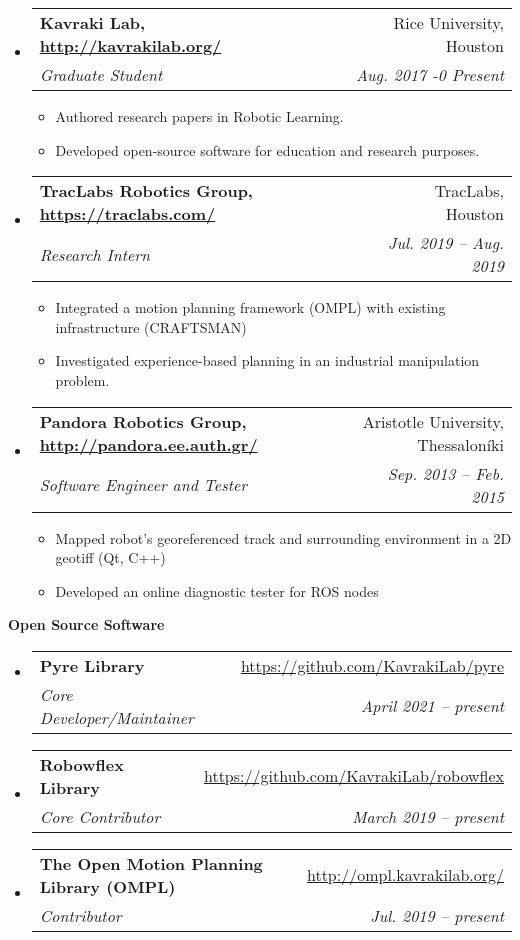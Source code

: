 \documentclass[letterpaper,11pt]{article}
\makeatletter
\newcommand{\resitem}[1]{\item #1 \vspace{-2pt}}
\newcommand{\resheading}[1]{{\large \colorbox{mygrey}{\begin{minipage}{\textwidth}{\textbf{#1 \vphantom{p\^{E}}}}\end{minipage}}}}
\newcommand{\ressubheading}[4]{
\begin{tabular*}{7.0in}{l@{\extracolsep{\fill}}r}
		\textbf{#1} & #2 \\
		\textit{#3} & \textit{#4} \\
\end{tabular*}\vspace{-6pt}}
\makeatother
\begin{document}
\begin{itemize}
	
    \item
        \ressubheading{Kavraki Lab, \url{http://kavrakilab.org/}}
	{Rice University, Houston}{Graduate Student}
	{Aug. 2017 -0 Present  }
	\begin{itemize}
		\resitem{Authored research papers in Robotic Learning.}
		\resitem{Developed open-source software for education and research purposes.}
	\end{itemize}
    \item
    \ressubheading{TracLabs Robotics Group, \url{https://traclabs.com/}}
    {TracLabs, Houston}{Research Intern}
    {Jul. 2019 -- Aug. 2019}
    \begin{itemize}
    	\resitem{Integrated a motion planning framework (OMPL) with existing infrastructure (CRAFTSMAN)}
    \resitem{Investigated experience-based planning in an industrial manipulation problem.}
    \end{itemize}
	\item
     \ressubheading{Pandora Robotics Group, \url{http://pandora.ee.auth.gr/}}
	{Aristotle University, Thessaloníki}{Software Engineer and Tester}
	{Sep. 2013 -- Feb. 2015}
	\begin{itemize}
		\resitem{Mapped robot’s georeferenced track and surrounding environment in a 2D geotiff (Qt, C++)}
		\resitem{Developed an online diagnostic tester for ROS nodes}
	\end{itemize}
\end{itemize}


\resheading{Open Source Software}
\begin{itemize}
    \item \ressubheading{Pyre Library}
        {\url{https://github.com/KavrakiLab/pyre}}{Core Developer/Maintainer}{April 2021 -- present}
    \item \ressubheading{Robowflex Library}
        {\url{https://github.com/KavrakiLab/robowflex}}{Core Contributor}{March 2019 -- present}
    \item \ressubheading{The Open Motion Planning Library (OMPL) }
        {\url{http://ompl.kavrakilab.org/}}{Contributor}{Jul. 2019 -- present}
\end{itemize}	
\end{document}
